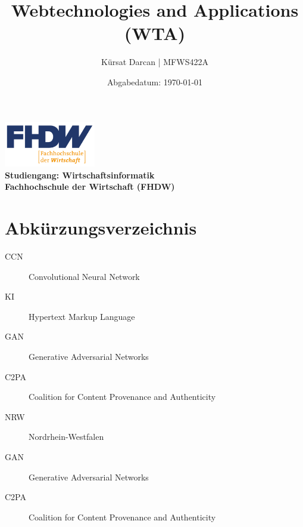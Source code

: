 \documentclass[a4paper,12pt]{article}
\title{\textbf{Webtechnologies and Applications (WTA)}}
\author{Kürsat Darcan | MFWS422A}
\date{Abgabedatum: \today}
\begin{document}
\maketitle
\thispagestyle{empty}
\vspace{2cm}
\begin{center}
    \includegraphics[width=0.3\textwidth]{FHDW_Logo_RGB-01.svg.png} %
    \\
    \vspace{1cm}
    \textbf{Studiengang: Wirtschaftsinformatik}\\
    \textbf{Fachhochschule der Wirtschaft (FHDW)}
\end{center}
\newpage

\renewcommand{\thepage}{\roman{page}} %
\tableofcontents
\newpage



\section*{Abkürzungsverzeichnis}
\begin{description}
    \item[CCN] Convolutional Neural Network
    \item[KI] Hypertext Markup Language
    \item[GAN] Generative Adversarial Networks
    \item[C2PA] Coalition for Content Provenance and Authenticity
    \item[NRW] Nordrhein-Westfalen
    \item[GAN] Generative Adversarial Networks
    \item[C2PA] Coalition for Content Provenance and Authenticity
\end{description}
\newpage

\renewcommand{\thepage}{\arabic{page}} %
\setcounter{page}{1}
\end{document}
